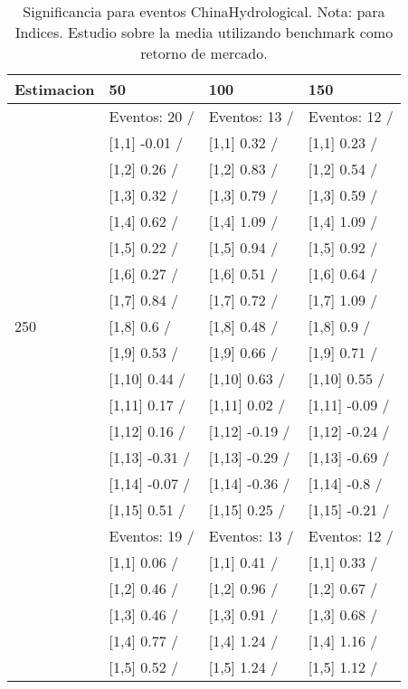 \begin{table}

\caption{Significancia para eventos ChinaHydrological. Nota: para Indices. Estudio sobre la media utilizando benchmark como retorno de mercado.}
\centering
\begin{tabular}[t]{llll}
\toprule
Estimacion & 50 & 100 & 150\\
\midrule
 & Eventos:  20 / & Eventos:  13 / & Eventos:  12 /\\
 & {}[1,1] -0.01  / & {}[1,1] 0.32  / & {}[1,1] 0.23  /\\
 & {}[1,2] 0.26  / & {}[1,2] 0.83  / & {}[1,2] 0.54  /\\
 & {}[1,3] 0.32  / & {}[1,3] 0.79  / & {}[1,3] 0.59  /\\
 & {}[1,4] 0.62  / & {}[1,4] 1.09  / & {}[1,4] 1.09  /\\
\addlinespace
 & {}[1,5] 0.22  / & {}[1,5] 0.94  / & {}[1,5] 0.92  /\\
 & {}[1,6] 0.27  / & {}[1,6] 0.51  / & {}[1,6] 0.64  /\\
 & {}[1,7] 0.84  / & {}[1,7] 0.72  / & {}[1,7] 1.09  /\\
250 & {}[1,8] 0.6  / & {}[1,8] 0.48  / & {}[1,8] 0.9  /\\
 & {}[1,9] 0.53  / & {}[1,9] 0.66  / & {}[1,9] 0.71  /\\
\addlinespace
 & {}[1,10] 0.44  / & {}[1,10] 0.63  / & {}[1,10] 0.55  /\\
 & {}[1,11] 0.17  / & {}[1,11] 0.02  / & {}[1,11] -0.09  /\\
 & {}[1,12] 0.16  / & {}[1,12] -0.19  / & {}[1,12] -0.24  /\\
 & {}[1,13] -0.31  / & {}[1,13] -0.29  / & {}[1,13] -0.69  /\\
 & {}[1,14] -0.07  / & {}[1,14] -0.36  / & {}[1,14] -0.8  /\\
\addlinespace
 & {}[1,15] 0.51  / & {}[1,15] 0.25  / & {}[1,15] -0.21  /\\
 & Eventos:  19 / & Eventos:  13 / & Eventos:  12 /\\
 & {}[1,1] 0.06  / & {}[1,1] 0.41  / & {}[1,1] 0.33  /\\
 & {}[1,2] 0.46  / & {}[1,2] 0.96  / & {}[1,2] 0.67  /\\
 & {}[1,3] 0.46  / & {}[1,3] 0.91  / & {}[1,3] 0.68  /\\
\addlinespace
 & {}[1,4] 0.77  / & {}[1,4] 1.24  / & {}[1,4] 1.16  /\\
 & {}[1,5] 0.52  / & {}[1,5] 1.24  / & {}[1,5] 1.12  /\\

\end{tabular}
\end{table}
